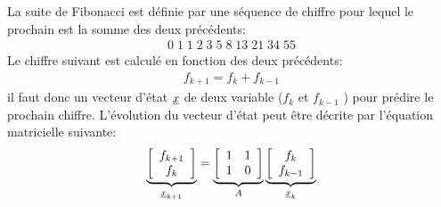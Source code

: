 \begin{example}
La suite de Fibonacci est définie par une séquence de chiffre pour lequel le prochain est la somme des deux précédents:
\begin{align}
0 \; 1\;1\;2\;3\;5\;8\;13\;21\;34\;55
\end{align}
Le chiffre suivant est calculé en fonction des deux précédents:
\begin{align}
f_{k+1} = f_{k} + f_{k-1}
\end{align}
il faut donc un vecteur d'état $\underline{x}$ de deux variable ($f_{k}$ et $f_{k-1}$ ) pour prédire le prochain chiffre. L'évolution du vecteur d'état peut être décrite par l'équation matricielle suivante:
\begin{align}
\underbrace{
\left[ \begin{array}{c}  
f_{k+1} \\ f_{k}
\end{array} \right]
}_{\underline{x}_{k+1}}
=
\underbrace{
\left[ \begin{array}{c c}  
1 & 1 \\ 1 & 0 
\end{array} \right]
}_{A}
\underbrace{
\left[ \begin{array}{c}  
f_{k} \\ f_{k-1}
\end{array} \right]
}_{\underline{x}_{k}}
\end{align}


\end{example}
